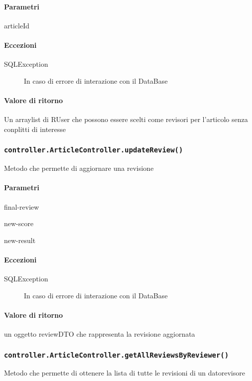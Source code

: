 \paragraph{Parametri}
\begin{description}
\item articleId
\end{description}
\paragraph{Eccezioni}
\begin{description}
\item[SQLException] In caso di errore di interazione con il DataBase
\end{description}
\paragraph{Valore di ritorno}
Un arraylist di RUser che possono essere scelti come revisori per l'articolo senza conplitti di interesse


\subsubsection{\texttt{controller.ArticleController.updateReview()}}
Metodo che permette di aggiornare una revisione
\paragraph{Parametri}
\begin{description}
\item final-review
\item new-score
\item new-result
\end{description}
\paragraph{Eccezioni}
\begin{description}
\item[SQLException] In caso di errore di interazione con il DataBase
\end{description}
\paragraph{Valore di ritorno}
un oggetto reviewDTO che rappresenta la revisione aggiornata


\subsubsection{\texttt{controller.ArticleController.getAllReviewsByReviewer()}}
Metodo che permette di ottenere la lista di tutte le revisioni di un datorevisore
